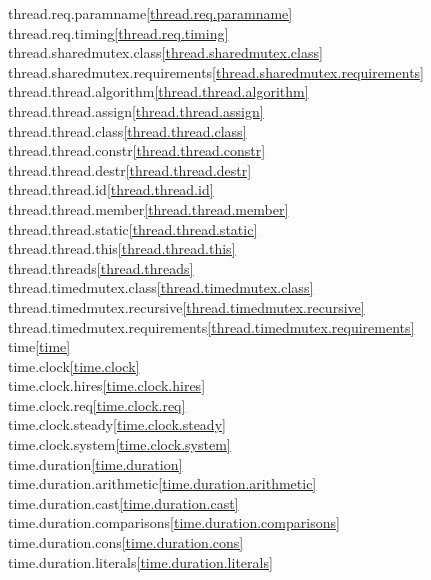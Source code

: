 \begin{multicols}{2}
thread.req.paramname\quad\ref{thread.req.paramname}\\
thread.req.timing\quad\ref{thread.req.timing}\\
thread.sharedmutex.class\quad\ref{thread.sharedmutex.class}\\
thread.sharedmutex.requirements\quad\ref{thread.sharedmutex.requirements}\\
thread.thread.algorithm\quad\ref{thread.thread.algorithm}\\
thread.thread.assign\quad\ref{thread.thread.assign}\\
thread.thread.class\quad\ref{thread.thread.class}\\
thread.thread.constr\quad\ref{thread.thread.constr}\\
thread.thread.destr\quad\ref{thread.thread.destr}\\
thread.thread.id\quad\ref{thread.thread.id}\\
thread.thread.member\quad\ref{thread.thread.member}\\
thread.thread.static\quad\ref{thread.thread.static}\\
thread.thread.this\quad\ref{thread.thread.this}\\
thread.threads\quad\ref{thread.threads}\\
thread.timedmutex.class\quad\ref{thread.timedmutex.class}\\
thread.timedmutex.recursive\quad\ref{thread.timedmutex.recursive}\\
thread.timedmutex.requirements\quad\ref{thread.timedmutex.requirements}\\
time\quad\ref{time}\\
time.clock\quad\ref{time.clock}\\
time.clock.hires\quad\ref{time.clock.hires}\\
time.clock.req\quad\ref{time.clock.req}\\
time.clock.steady\quad\ref{time.clock.steady}\\
time.clock.system\quad\ref{time.clock.system}\\
time.duration\quad\ref{time.duration}\\
time.duration.arithmetic\quad\ref{time.duration.arithmetic}\\
time.duration.cast\quad\ref{time.duration.cast}\\
time.duration.comparisons\quad\ref{time.duration.comparisons}\\
time.duration.cons\quad\ref{time.duration.cons}\\
time.duration.literals\quad\ref{time.duration.literals}\\

\end{multicols}
